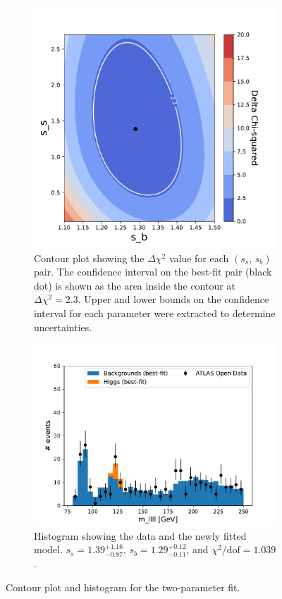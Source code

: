 \documentclass[11pt]{article}
\newcommand{\chisq}{\chi^2}
\newcommand{\chisqdof}{\chi^2/\mathrm{dof}}
\numberwithin{equation}{section}
\numberwithin{figure}{section}
\numberwithin{table}{section}
\begin{document}
\begin{figure}[h]%
    \centering
    \begin{subfigure}{.5\textwidth}
        \centering
        \includegraphics[width=0.98\linewidth]{Plots/two_fit_contour.pdf}
        \caption{Contour plot showing the $\Delta\chisq$ value for each $(s_s,\,s_b)$ pair. The confidence interval on the best-fit pair (black dot) is shown as the area inside the contour at $\Delta\chisq=2.3$. Upper and lower bounds on the confidence interval for each parameter were extracted to determine uncertainties.}
        \label{fig:two_fit_contour}
    \end{subfigure}\;%
    \begin{subfigure}{.5\textwidth}
        \centering
        \includegraphics[width=0.98\linewidth]{Plots/two_fit_hist.pdf}
        \caption{Histogram showing the data and the newly fitted model. $s_s=1.39^{+1.16}_{-0.87}$, $s_b=1.29^{+0.12}_{-0.11}$, and $\chisqdof=1.039$.}
        \label{fig:two_fit_hist}
    \end{subfigure}
    \caption{Contour plot and histogram for the two-parameter fit.}
    \label{fig:two_fit}
\end{figure}
\end{document}
